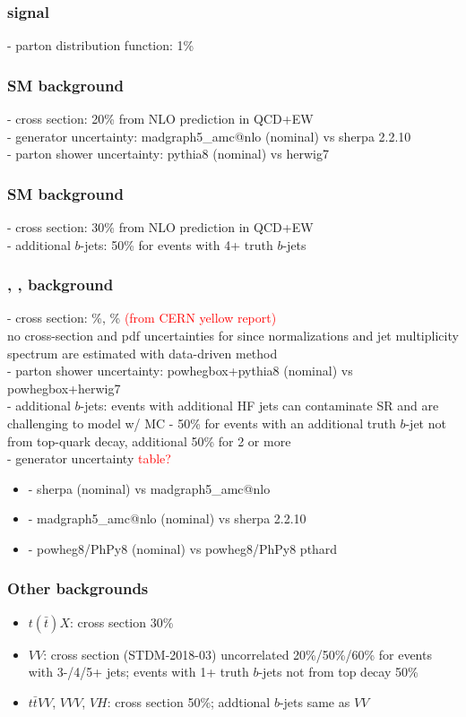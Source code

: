 \documentclass[../thesis.tex]{subfiles}
\begin{document}
\subsubsection*{\ttZp signal}
- parton distribution function: 1\%

\subsubsection*{SM \tttt background}
- cross section: 20\% from NLO prediction in QCD+EW\\
- generator uncertainty: madgraph5\_amc@nlo (nominal) vs sherpa 2.2.10\\
- parton shower uncertainty: pythia8 (nominal) vs herwig7

\subsubsection*{SM \ttt background}
- cross section: 30\% from NLO prediction in QCD+EW\\
- additional $b$-jets: 50\% for \ttt events with 4+ truth $b$-jets

\subsubsection*{\ttW, \ttZ, \ttH background}
- cross section: \%, \% \textcolor{red}{(from CERN yellow report)}\\
no cross-section and pdf uncertainties for \ttW since normalizations and jet multiplicity spectrum are estimated with data-driven method\\
- parton shower uncertainty: \ttH powhegbox+pythia8 (nominal) vs powhegbox+herwig7\\
- additional $b$-jets: events with additional HF jets can contaminate SR and are challenging to model w/ MC - 50\% for events with an additional truth $b$-jet not from top-quark decay, additional 50\% for 2 or more\\
- generator uncertainty \textcolor{red}{table?}
\begin{itemize}
\item \ttW - sherpa (nominal) vs madgraph5\_amc@nlo
\item \ttZ - madgraph5\_amc@nlo (nominal) vs sherpa 2.2.10
\item \ttH - powheg8/PhPy8 (nominal) vs powheg8/PhPy8 pthard
\end{itemize} 

\subsubsection*{Other backgrounds}
\begin{itemize}
\item $t(\bar{t})X$: cross section 30\%
\item $VV$: cross section (STDM-2018-03) uncorrelated 20\%/50\%/60\% for events with 3-/4/5+ jets; events with 1+ truth $b$-jets not from top decay 50\%
\item $t\bar{t}VV$, $VVV$, $VH$: cross section 50\%; addtional $b$-jets same as $VV$
\end{itemize}
\end{document}
